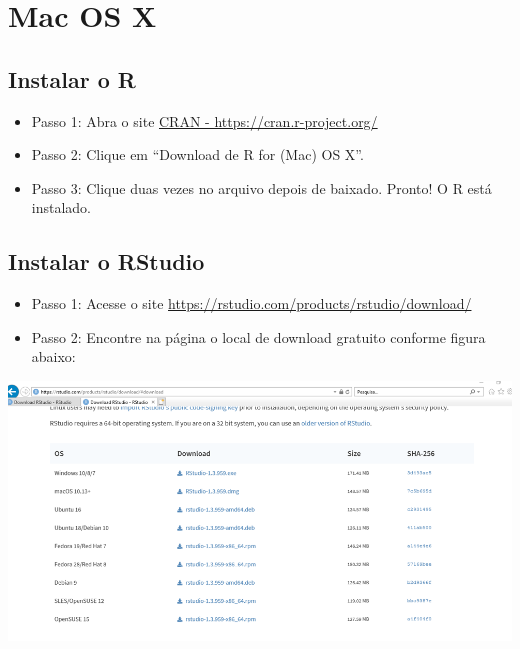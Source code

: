 \documentclass[
  10pt,
  brazil,
  a4paper,
  twoside, notitlepage, openright]{book}
\providecommand{\tightlist}{%
  \setlength{\itemsep}{0pt}\setlength{\parskip}{0pt}}
\begin{document}
\hypertarget{mac-os-x}{%
\section{Mac OS X}\label{mac-os-x}}

\hypertarget{instalar-o-r-1}{%
\subsection{Instalar o R}\label{instalar-o-r-1}}

\begin{itemize}
\tightlist
\item
  Passo 1: Abra o site \href{https://cran.r-project.org/}{CRAN - https://cran.r-project.org/}
\item
  Passo 2: Clique em ``Download de R for (Mac) OS X''.\\
\item
  Passo 3: Clique duas vezes no arquivo depois de baixado. Pronto! O R está instalado.
\end{itemize}

\hypertarget{instalar-o-rstudio-1}{%
\subsection{Instalar o RStudio}\label{instalar-o-rstudio-1}}

\begin{itemize}
\tightlist
\item
  Passo 1: Acesse o site \url{https://rstudio.com/products/rstudio/download/}\\
\item
  Passo 2: Encontre na página o local de download gratuito conforme figura abaixo:
\end{itemize}

\includegraphics[width=13.54in]{img/inst_1_rstudio}
\end{document}
